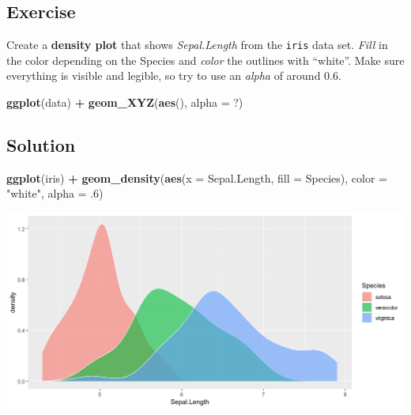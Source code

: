 \documentclass[
]{book}
\newenvironment{Shaded}{\begin{snugshade}}{\end{snugshade}}
\newcommand{\AttributeTok}[1]{\textcolor[rgb]{0.13,0.29,0.53}{#1}}
\newcommand{\DecValTok}[1]{\textcolor[rgb]{0.00,0.00,0.81}{#1}}
\newcommand{\FunctionTok}[1]{\textcolor[rgb]{0.13,0.29,0.53}{\textbf{#1}}}
\newcommand{\NormalTok}[1]{#1}
\newcommand{\SpecialCharTok}[1]{\textcolor[rgb]{0.81,0.36,0.00}{\textbf{#1}}}
\newcommand{\StringTok}[1]{\textcolor[rgb]{0.31,0.60,0.02}{#1}}
\begin{document}
\subsection{Exercise}\label{exercise-1}

Create a \textbf{density plot} that shows \emph{Sepal.Length} from the \texttt{iris} data set.
\emph{Fill} in the color depending on the Species and \emph{color} the outlines with ``white''.
Make sure everything is visible and legible, so try to use an \emph{alpha} of around 0.6.

\begin{Shaded}
\begin{Highlighting}[]
\FunctionTok{ggplot}\NormalTok{(data) }\SpecialCharTok{+} 
  \FunctionTok{geom\_XYZ}\NormalTok{(}\FunctionTok{aes}\NormalTok{(), }\AttributeTok{alpha =}\NormalTok{ ?)}
\end{Highlighting}
\end{Shaded}

\subsection{Solution}\label{solution}

\begin{Shaded}
\begin{Highlighting}[]
\FunctionTok{ggplot}\NormalTok{(iris) }\SpecialCharTok{+} 
  \FunctionTok{geom\_density}\NormalTok{(}\FunctionTok{aes}\NormalTok{(}\AttributeTok{x =}\NormalTok{ Sepal.Length, }\AttributeTok{fill =}\NormalTok{ Species), }
               \AttributeTok{color =} \StringTok{"white"}\NormalTok{, }\AttributeTok{alpha =}\NormalTok{ .}\DecValTok{6}\NormalTok{)}
\end{Highlighting}
\end{Shaded}

\begin{flushleft}\includegraphics{_main_files/figure-html/unnamed-chunk-39-1} \end{flushleft}
\end{document}
